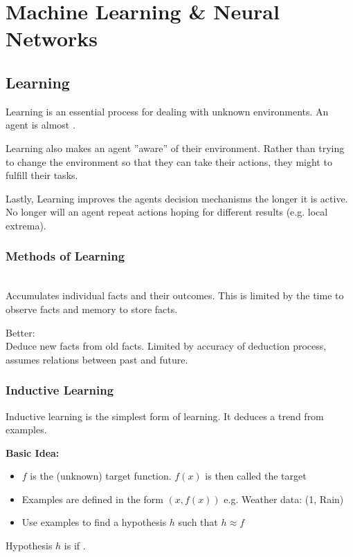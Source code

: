 \documentclass[
../EiKI_Summary.tex,
]
{subfiles}
\begin{document}
\section{Machine Learning \& Neural Networks}
\subsection{Learning}
Learning is an essential process for dealing with unknown environments. An agent is almost .

Learning also makes an agent ''aware'' of their environment. Rather than trying to change the environment so that they can take their actions, they might  to fulfill their tasks.

Lastly, Learning improves the agents decision mechanisms the longer it is active. No longer will an agent repeat actions hoping for different results (e.g. local extrema).

\subsubsection{Methods of Learning}
\\
Accumulates individual facts and their outcomes. This is limited by the time to observe facts and memory to store facts.

Better: \\
Deduce new facts from old facts. Limited by accuracy of deduction process, assumes relations between past and future.

\subsubsection{Inductive Learning}
Inductive learning is the simplest form of learning. It deduces a trend from examples.

\textbf{Basic Idea:}
\begin{itemize}
    \item $f$ is the (unknown) target function. $f(x)$ is then called the target
    \item Examples are defined in the form $(x,f(x))$ e.g. Weather data: (1, Rain)
    \item Use examples to find a hypothesis $h$ such that $h \approx f$
\end{itemize}

Hypothesis $h$ is  if .
\end{document}
